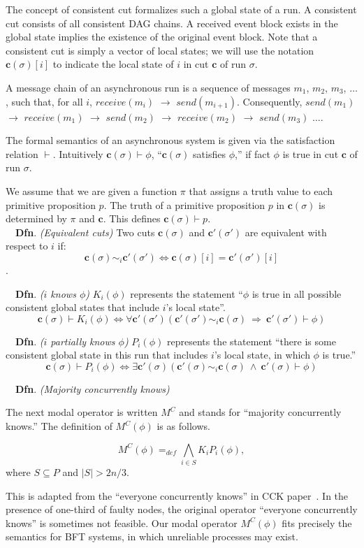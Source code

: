 \documentclass{article}
\newcommand{\dfnn}[2]{$\quad$\textbf{Dfn}. \emph{(#1)} {#2}}
\renewcommand{\vec}[1]{\mathbf{#1}}
\begin{document}
 The concept of consistent cut formalizes such a global state of a run. A consistent cut consists of all consistent DAG chains. A received event block exists in the global state implies the existence of the original event block. Note that a consistent cut is simply a vector of local states; we will use the notation $\vec{c}(\sigma)[i]$ to indicate the local state of $i$ in cut $\vec{c}$ of run $\sigma$.

A message chain of an asynchronous run is a sequence of messages $m_1$, $m_2$, $m_3$, $\dots$, such that, for all $i$, $receive(m_i)$ $\rightarrow$  $send(m_{i+1})$. Consequently, $send(m_1)$ $\rightarrow$ $receive(m_1)$ $\rightarrow$ $send(m_2)$ $\rightarrow$ $receive(m_2)$ $\rightarrow$ $send(m_3)$ $\dots$.

The formal semantics of an asynchronous system is given via  the satisfaction relation $\vdash$. Intuitively $\vec{c}(\sigma) \vdash \phi$, ``$\vec{c}(\sigma)$ satisfies $\phi$,'' if fact $\phi$ is true in cut $\vec{c}$ of run $\sigma$.

We assume that we are given a function $\pi$ that assigns a truth value to each primitive proposition $p$. The truth of a primitive proposition $p$ in $\vec{c}(\sigma)$ is determined by $\pi$ and $\vec{c}$. This defines $\vec{c}(\sigma) \vdash p$.\\

\dfnn{Equivalent cuts}{Two cuts $\vec{c}(\sigma)$ and $\vec{c'}(\sigma')$ are equivalent  with respect to $i$ if: $$\vec{c}(\sigma) \sim_i \vec{c'}(\sigma') \Leftrightarrow \vec{c}(\sigma)[i] = \vec{c'}(\sigma')[i]$$.}

\dfnn{$i$ knows $\phi$}{$K_i(\phi)$ represents the statement ``$\phi$ is true in all possible consistent global states that include $i$’s local state''. 
		$$\vec{c}(\sigma) \vdash K_i(\phi) \Leftrightarrow \forall \vec{c'}(\sigma')   (\vec{c'}(\sigma') \sim_i \vec{c}(\sigma) \ \Rightarrow\ \vec{c'}(\sigma') \vdash \phi) $$}

\dfnn{$i$ partially knows $\phi$}{$P_i(\phi)$ represents the statement ``there is some consistent global state in this run that includes $i$’s local state, in which $\phi$ is true.''
		$$\vec{c}(\sigma) \vdash P_i(\phi) \Leftrightarrow \exists \vec{c'}(\sigma) ( \vec{c'}(\sigma) \sim_i \vec{c}(\sigma) \ \wedge\ \vec{c'}(\sigma) \vdash \phi )$$}
		
\dfnn{Majority concurrently knows}{The next modal operator is written $M^C$ and stands for ``majority concurrently knows.''
The definition of $M^C(\phi)$ is as follows.

$$M^C(\phi) =_{def} \bigwedge_{i \in S} K_i P_i(\phi), $$ where $S \subseteq P$ and $|S| > 2n/3$.}
 This is adapted from the ``everyone concurrently knows'' in CCK paper~\cite{cck92}.
In the presence of one-third of faulty nodes, the original operator ``everyone concurrently knows'' is sometimes not feasible.
Our modal operator $M^C(\phi)$ fits precisely the semantics for BFT systems, in which unreliable processes may exist.\\
\end{document}
